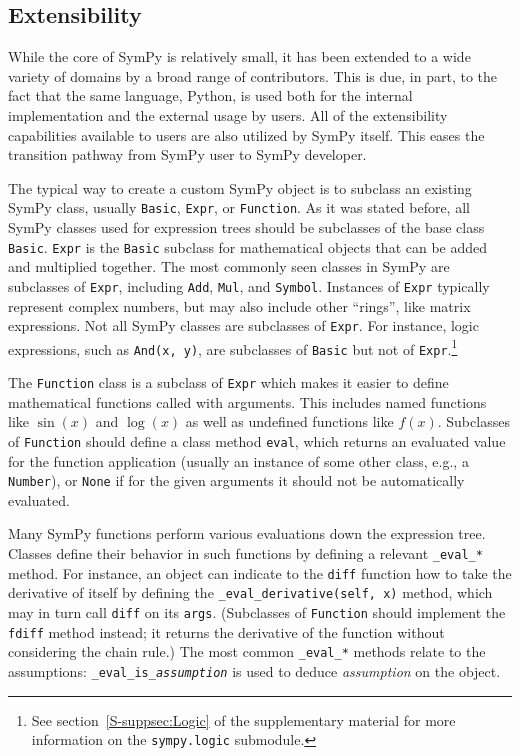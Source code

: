 
\subsection{Extensibility}

While the core of SymPy is relatively small, it has been extended to a wide variety
of domains by a broad range of contributors.
This is due, in part, to the fact that the same language, Python,
is used both for the internal implementation and the external usage by users.
All of the extensibility capabilities available to
users are also utilized by SymPy itself. This eases the transition pathway from
SymPy user to SymPy developer.

The typical way to create a custom SymPy object is to subclass an existing
SymPy class, usually \texttt{Basic}, \texttt{Expr}, or \texttt{Function}. As
it was stated before, all SymPy classes used for expression trees should be
subclasses of the base class \texttt{Basic}. \texttt{Expr} is the
\texttt{Basic} subclass for mathematical objects that can be added and
multiplied together. The most commonly seen classes in SymPy are subclasses of
\texttt{Expr}, including \texttt{Add}, \texttt{Mul}, and \texttt{Symbol}.
Instances of \texttt{Expr} typically represent complex numbers, but may also
include other ``rings'', like matrix expressions. Not all SymPy classes are
subclasses of \texttt{Expr}. For instance, logic expressions, such as
\verb|And(x, y)|, are subclasses of \texttt{Basic} but not of
\texttt{Expr}.\footnote{See section~\ref{S-suppsec:Logic} of the supplementary
  material for more information on the
  \texttt{sympy.logic} submodule.}

The \texttt{Function} class is a subclass of \texttt{Expr} which makes it
easier to define mathematical functions called with arguments. This includes
named functions like $\sin(x)$ and $\log(x)$ as well as undefined functions
like $f(x)$. Subclasses of \texttt{Function} should define a
class method \texttt{eval}, which returns an evaluated value for the function
application (usually an instance of some other class, e.g., a \texttt{Number}),
or \texttt{None} if for the given arguments it should not be
automatically evaluated.

Many SymPy functions perform various evaluations down the expression tree.
Classes define their behavior in such functions by defining a relevant
\verb|_eval_|\texttt{\textit{*}} method. For instance, an object can indicate
to the \texttt{diff} function how to take the derivative of itself by defining
the \verb|_eval_derivative(self, x)| method, which may in turn call
\texttt{diff} on its \texttt{args}. (Subclasses of \texttt{Function} should
implement the \texttt{fdiff} method instead; it returns the derivative of the function
without considering the chain rule.) The most common
\verb|_eval_|\texttt{\textit{*}} methods relate to the assumptions:
\verb|_eval_is_|\texttt{\textit{assumption}} is used to deduce
\textit{assumption} on the object.

